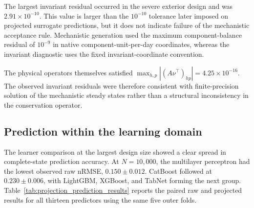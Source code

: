The largest invariant residual occurred in the severe exterior design and was
$2.91\times10^{-10}$. This value is larger than the $10^{-10}$ tolerance later imposed on projected surrogate predictions, but it does not indicate failure of the mechanistic acceptance rule. Mechanistic generation used the maximum component-balance residual of $10^{-9}$ in native component-unit-per-day coordinates, whereas the invariant diagnostic uses the fixed invariant-coordinate convention.

The physical operators themselves satisfied
$\max_{h,p}|(A\nu^\top)_{hp}|=4.25\times10^{-16}$.
The observed invariant residuals were therefore consistent with finite-precision solution of the mechanistic steady states rather than a structural inconsistency in the conservation operator.

\subsection{Prediction within the learning domain}

The learner comparison at the largest design size showed a clear spread in complete-state prediction accuracy. At $N=10{,}000$, the multilayer perceptron had the lowest observed raw nRMSE,
$0.150\pm0.012$.
CatBoost followed at
$0.230\pm0.006$,
with LightGBM, XGBoost, and TabNet forming the next group. Table~\ref{tab:projection_prediction_results} reports the paired raw and projected results for all thirteen predictors using the same five outer folds.

